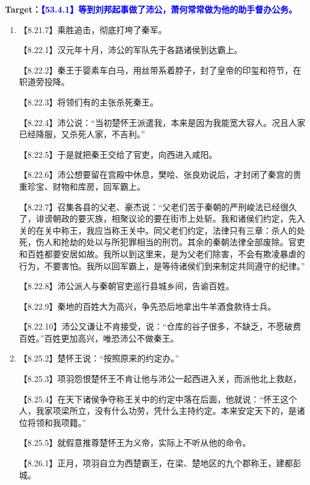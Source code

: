 \documentclass[fontset=none,11pt,a4paper]{ctexart}
\begin{document}
\textbf{Target：}\textcolor{blue}{\textbf{【53.4.1】等到刘邦起事做了沛公，萧何常常做为他的助手督办公务。}}

\begin{enumerate}[label=\Alph*.]
  \item
\noindent 【8.21.7】乘胜追击，彻底打垮了秦军。\par
\noindent 【8.22.1】汉元年十月，沛公的军队先于各路诸侯到达霸上。\par
\noindent 【8.22.2】秦王于婴素车白马，用丝带系着脖子，封了皇帝的印玺和符节，在轵道旁投降。\par
\noindent 【8.22.3】将领们有的主张杀死秦王。\par
\noindent 【8.22.4】沛公说：“当初楚怀王派遣我，本来是因为我能宽大容人。况且人家已经降服，又杀死人家，不吉利。”\par
\noindent 【8.22.5】于是就把秦王交给了官吏，向西进入咸阳。\par
\noindent 【8.22.6】沛公想要留在宫殿中休息，樊哙、张良劝说后，才封闭了秦宫的贵重珍宝、财物和库房，回军霸上。\par
\noindent 【8.22.7】召集各县的父老、豪杰说：“父老们苦于秦朝的严刑峻法已经很久了，诽谤朝政的要灭族，相聚议论的要在街市上处斩。我和诸侯们约定，先入关的在关中称王，我应当称王关中。同父老们约定，法律只有三章：杀人的处死，伤人和抢劫的处以与所犯罪相当的刑罚。其余的秦朝法律全部废除。官吏和百姓都要安居如故。我所以到这里来，是为父老们除害，不会有欺凌暴虐的行为，不要害怕。我所以回军霸上，是等待诸侯们到来制定共同遵守的纪律。”\par
\noindent 【8.22.8】沛公派人与秦朝官吏巡行县城乡间，告谕百姓。\par
\noindent 【8.22.9】秦地的百姓大为高兴，争先恐后地拿出牛羊酒食款待士兵。\par
\noindent 【8.22.10】沛公又谦让不肯接受，说：“仓库的谷子很多，不缺乏，不愿破费百姓。”百姓更加高兴，唯恐沛公不做秦王。\par
  \item
\noindent 【8.25.2】楚怀王说：“按照原来的约定办。”\par
\noindent 【8.25.3】项羽怨恨楚怀王不肯让他与沛公一起西进入关，而派他北上救赵，\par
\noindent 【8.25.4】在天下诸侯争夺称王关中的约定中落在后面，他就说：“怀王这个人，我家项梁所立，没有什么功劳，凭什么主持约定。本来安定天下的，是诸位将领和我项籍。”\par
\noindent 【8.25.5】就假意推尊楚怀王为义帝，实际上不听从他的命令。\par
\noindent 【8.26.1】正月，项羽自立为西楚霸王，在梁、楚地区的九个郡称王，建都彭城。\par

\end{enumerate}
\end{document}

